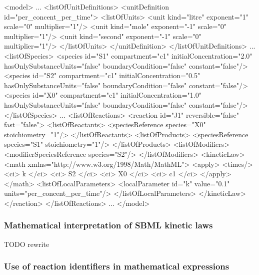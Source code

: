 \begin{example}
<model>
    ...
    <listOfUnitDefinitions>
        <unitDefinition id="per_concent_per_time">
            <listOfUnits>
                <unit kind="litre" exponent="1" scale="0" multiplier="1"/>
                <unit kind="mole"   exponent="-1" scale="0" multiplier="1"/>
                <unit kind="second" exponent="-1" scale="0" multiplier="1"/>
            </listOfUnits>
        </unitDefinition>
    </listOfUnitDefinitions>
    ...
    <listOfSpecies>
        <species id="S1" compartment="c1" initialConcentration="2.0" 
              hasOnlySubstanceUnits="false" boundaryCondition="false" constant="false"/>
        <species id="S2" compartment="c1" initialConcentration="0.5" 
              hasOnlySubstanceUnits="false" boundaryCondition="false" constant="false"/>
        <species id="X0" compartment="c1" initialConcentration="1.0" 
              hasOnlySubstanceUnits="false" boundaryCondition="false" constant="false"/>
    </listOfSpecies>
    ...
    <listOfReactions>
        <reaction id="J1" reversible="false" fast="false">
            <listOfReactants>
                <speciesReference species="X0" stoichiometry="1"/>
            </listOfReactants>
            <listOfProducts>
                <speciesReference species="S1" stoichiometry="1"/>
            </listOfProducts>
            <listOfModifiers>
                <modifierSpeciesReference species="S2"/>
            </listOfModifiers>
            <kineticLaw>
                <math xmlns="http://www.w3.org/1998/Math/MathML">
                    <apply>
                        <times/> <ci> k </ci> <ci> S2 </ci> <ci> X0 </ci> <ci> c1 </ci>
                    </apply>
                </math>
                <listOfLocalParameters>
                    <localParameter id="k" value="0.1" units="per_concent_per_time"/>
                </listOfLocalParameters>
            </kineticLaw>
        </reaction>
    </listOfReactions>
    ...
</model>
\end{example}



\subsubsection{Mathematical interpretation of SBML kinetic laws}
\label{sec:about-kinetic-laws}

TODO rewrite

\subsubsection{Use of reaction identifiers in mathematical expressions}
\label{subsec:reaction-as-symbol}

